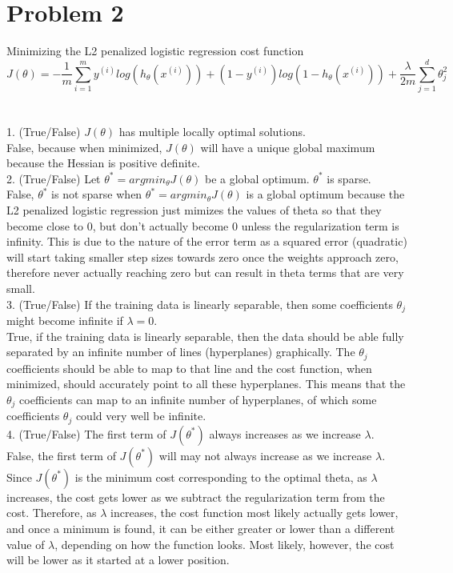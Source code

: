 \documentclass[12pt]{article}
\begin{document}
\section*{Problem 2}
Minimizing the L2 penalized logistic regression cost function
$$J(\theta) = - \frac{1}{m}\sum_{i=1}^my^{(i)}log(h_\theta(x^{(i)})) + (1 - y^{(i)})log(1-h_\theta(x^{(i)})) + \frac{\lambda}{2m}\sum_{j=1}^d\theta_j^2$$\\
\\
1. (True/False) $J(\theta)$ has multiple locally optimal solutions.\\
False, because when minimized, $J(\theta)$ will have a unique global maximum because the Hessian is positive definite.\\

2. (True/False) Let $\theta^* = argmin_\theta J(\theta)$ be a global optimum. $\theta^*$ is sparse.\\
False, $\theta^*$ is not sparse when $\theta^* = argmin_\theta J(\theta)$ is a global optimum because the L2 penalized logistic regression just mimizes the values of theta so that they become close to 0, but don't actually become 0 unless the regularization term is infinity. This is due to the nature of the error term as a squared error (quadratic) will start taking smaller step sizes towards zero once the weights approach zero, therefore never actually reaching zero but can result in theta terms that are very small. \\

3. (True/False) If the training data is linearly separable, then some coefficients $\theta_j$ might become infinite if $\lambda = 0$.\\
True, if the training data is linearly separable, then the data should be able fully separated by an infinite number of lines (hyperplanes) graphically. The $\theta_j$ coefficients should be able to map to that line and the cost function, when minimized, should accurately point to all these hyperplanes. This means that the $\theta_j$  coefficients can map to an infinite number of hyperplanes, of which some coefficients $\theta_j$ could very well be infinite.\\

4. (True/False) The first term of $J(\theta^*)$ always increases as we increase $\lambda$.\\
False, the first term of $J(\theta^*)$ will may not always increase as we increase $\lambda$.  Since $J(\theta^*)$ is the minimum cost corresponding to the optimal theta, as $\lambda$ increases, the cost gets lower as we subtract the regularization term from the cost. Therefore, as $\lambda$ increases, the cost function most likely actually gets lower, and once a minimum is found, it can be either greater or lower than a different value of $\lambda$, depending on how the function looks. Most likely, however, the cost will be lower as it started at a lower position.\\
\end{document}
